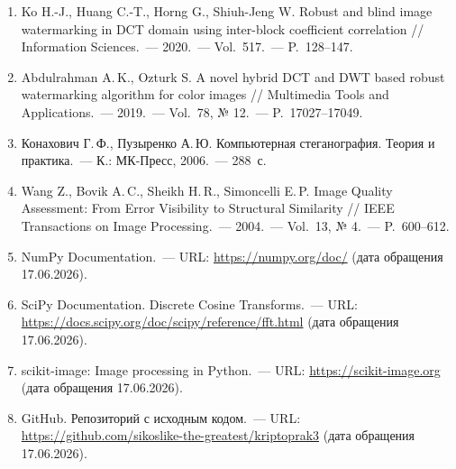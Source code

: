 \documentclass[12pt,a4paper]{article}
\begin{document}
\begin{enumerate}
    \item Ko H.-J., Huang C.-T., Horng G., Shiuh-Jeng W. Robust and blind image watermarking in DCT domain using inter-block coefficient correlation // Information Sciences.~--- 2020.~--- Vol.~517.~--- P.~128--147.
    \item Abdulrahman A.\,K., Ozturk S. A novel hybrid DCT and DWT based robust watermarking algorithm for color images // Multimedia Tools and Applications.~--- 2019.~--- Vol.~78, № 12.~--- P.~17027--17049.
    \item Конахович Г.\,Ф., Пузыренко А.\,Ю. Компьютерная стеганография. Теория и практика.~--- К.: МК-Пресс, 2006.~--- 288~с.
    \item Wang Z., Bovik A.\,C., Sheikh H.\,R., Simoncelli E.\,P. Image Quality Assessment: From Error Visibility to Structural Similarity // IEEE Transactions on Image Processing.~--- 2004.~--- Vol.~13, № 4.~--- P.~600--612.
    \item NumPy Documentation.~--- URL: \url{https://numpy.org/doc/} (дата обращения 17.06.2026).
    \item SciPy Documentation. Discrete Cosine Transforms.~--- URL: \url{https://docs.scipy.org/doc/scipy/reference/fft.html} (дата обращения 17.06.2026).
    \item scikit-image: Image processing in Python.~--- URL: \url{https://scikit-image.org} (дата обращения 17.06.2026).
    \item GitHub. Репозиторий с исходным кодом.~--- URL: \url{https://github.com/sikoslike-the-greatest/kriptoprak3} (дата обращения 17.06.2026).
\end{enumerate}
\end{document}
